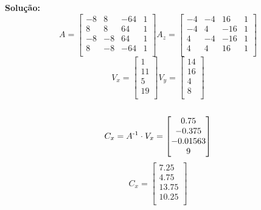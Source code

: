 \\
\\
\noindent\textbf{Solução:}
\\
\[
A = 
\begin{bmatrix}
    -8 & 8 & -64 & 1\\
     8 & 8 & 64 & 1\\
     -8 & -8 & 64 & 1\\
     8 & -8 & -64 & 1\\
\end{bmatrix}
A_z = 
\begin{bmatrix}
   -4 & -4 & 16 & 1\\
   -4 & 4 & -16 & 1\\
    4 & -4 & -16 & 1\\
    4 &  4 & 16 & 1\\
\end{bmatrix}
\]
\vspace{0.3cm}
\[
V_x = 
\begin{bmatrix}
   1\\
   11\\
   5\\
   19\\
\end{bmatrix}
V_y = 
\begin{bmatrix}
   14\\
   16\\
   4\\
   8\\
\end{bmatrix}
\]
\vspace{0.3cm}
\noindent{}\\
\[
C_x = A\textsuperscript{-1} \cdot V_x = 
\begin{bmatrix}
   0.75\\
   -0.375\\
   -0.01563\\
   9\\
\end{bmatrix}
\]
\vspace{0.3cm}
\[
C_x = 
\begin{bmatrix}
   7.25\\
   4.75\\
   13.75\\
   10.25\\
\end{bmatrix}
\]
\vspace{0.3cm}
\noindent{}\\
